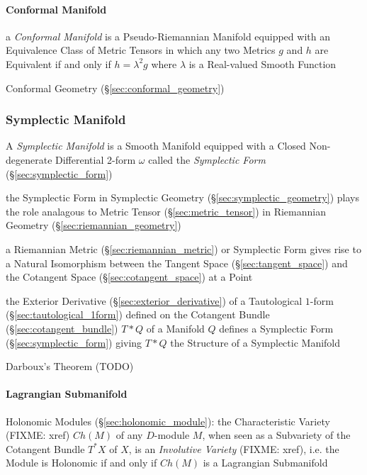 \paragraph{Conformal Manifold}\label{sec:conformal_manifold}\hfill

a \emph{Conformal Manifold} is a Pseudo-Riemannian Manifold equipped with an
Equivalence Class of Metric Tensors in which any two Metrics $g$ and $h$ are
Equivalent if and only if $h = \lambda^2 g$ where $\lambda$ is a Real-valued
Smooth Function

\fist Conformal Geometry (\S\ref{sec:conformal_geometry})



\subsubsection{Symplectic Manifold}\label{sec:symplectic_manifold}

A \emph{Symplectic Manifold} is a Smooth Manifold equipped with a Closed
Non-degenerate Differential 2-form $\omega$ called the \emph{Symplectic Form}
(\S\ref{sec:symplectic_form})

the Symplectic Form in Symplectic Geometry (\S\ref{sec:symplectic_geometry})
plays the role analagous to Metric Tensor (\S\ref{sec:metric_tensor}) in
Riemannian Geometry (\S\ref{sec:riemannian_geometry})

a Riemannian Metric (\S\ref{sec:riemannian_metric}) or Symplectic Form gives
rise to a Natural Isomorphism between the Tangent Space
(\S\ref{sec:tangent_space}) and the Cotangent Space
(\S\ref{sec:cotangent_space}) at a Point

the Exterior Derivative (\S\ref{sec:exterior_derivative}) of a Tautological
$1$-form (\S\ref{sec:tautological_1form}) defined on the Cotangent Bundle
(\S\ref{sec:cotangent_bundle}) $T *
Q$ of a Manifold $Q$ defines a Symplectic Form (\S\ref{sec:symplectic_form})
giving $T * Q$ the Structure of a Symplectic Manifold

Darboux's Theorem (TODO)



\paragraph{Lagrangian Submanifold}\label{sec:lagrangian_submanifold}\hfill

\fist Holonomic Modules (\S\ref{sec:holonomic_module}): the Characteristic
Variety (FIXME: xref) $Ch(M)$ of any $D$-module $M$, when seen as a Subvariety
of the Cotangent Bundle $T^*X$ of $X$, is an \emph{Involutive Variety} (FIXME:
xref), i.e. the Module is Holonomic if and only if $Ch(M)$ is a Lagrangian
Submanifold



